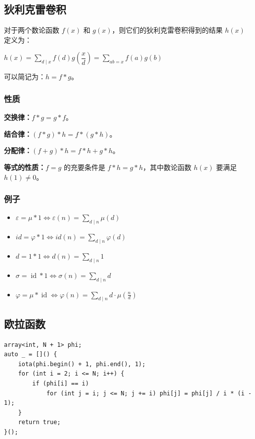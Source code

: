 \documentclass[UTF8]{ctexart}
\begin{document}
\begin{sloppypar}
\subsection{狄利克雷卷积}

对于两个数论函数 $f(x)$ 和 $g(x)$，则它们的狄利克雷卷积得到的结果 $h(x)$ 定义为：

$h(x)=\sum_{d\mid x}{f(d)g\left(\dfrac xd \right)}=\sum_{ab=x}{f(a)g(b)}$

可以简记为：$h=f*g$。

\subsubsection{性质}

\textbf{交换律：}$f*g=g*f$。

\textbf{结合律：}$(f*g)*h=f*(g*h)$。

\textbf{分配律：}$(f+g)*h=f*h+g*h$。

\textbf{等式的性质：}$f=g$ 的充要条件是 $f*h=g*h$，其中数论函数 $h(x)$ 要满足 $h(1)\ne 0$。

\subsubsection{例子}

\begin{itemize}
   \item $\varepsilon=\mu \ast 1\iff\varepsilon(n)=\sum_{d\mid n}\mu(d)$
   \item $id = \varphi * 1 \iff id(n)=\sum_{d\mid n} \varphi(d)$
   \item $d=1 \ast 1\iff d(n)=\sum_{d\mid n}1$
   \item $\sigma=\operatorname{id} \ast 1\iff\sigma(n)=\sum_{d\mid n}d$
   \item $\varphi=\mu \ast \operatorname{id}\iff\varphi(n)=\sum_{d\mid n}d\cdot\mu(\frac{n}{d})$
\end{itemize}

\subsection{欧拉函数}

\begin{lstlisting}[style=cpp]
array<int, N + 1> phi;
auto _ = []() {
    iota(phi.begin() + 1, phi.end(), 1);
    for (int i = 2; i <= N; i++) {
        if (phi[i] == i)
            for (int j = i; j <= N; j += i) phi[j] = phi[j] / i * (i - 1);
    }
    return true;
}();
\end{lstlisting}


\end{sloppypar}
\end{document}
